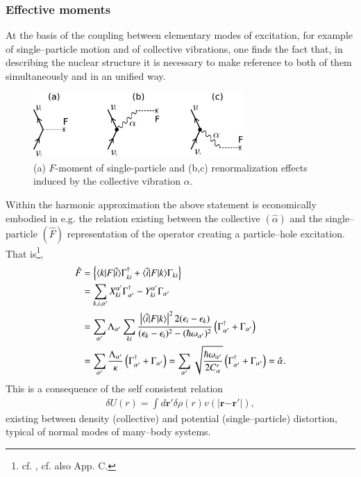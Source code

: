 \begin{subappendices}
\subsubsection{Effective moments}
At the basis of the coupling between elementary modes of excitation, for example of single--particle motion and of collective vibrations, one finds the fact that, in describing the nuclear structure it is necessary to make reference to both of them simultaneously and in an unified way.
   \begin{figure}
   \centerline{\includegraphics*[width=8cm,angle=0	]{nutshell/figs/fig3_A_1}}
   \caption{(a) $F$-moment of single-particle and (b,c) renormalization effects induced by the collective vibration $\alpha$.}\label{fig3.A.1}
   \end{figure}

Within the harmonic approximation the above statement is economically embodied in e.g. the relation existing between the collective $(\hat \alpha)$ and the single--particle $(\hat F)$ representation of the operator creating a particle--hole excitation. That is\footnote{cf. \cite{Bohr:75}, cf. also \cite{Brink:05} App. C.}, 
\begin{align}\label{eq1AppE1}
\nonumber \hat F&=\left\{\langle {k|F|\tilde i} \rangle\Gamma_{ki}^\dagger+\langle {\tilde i|F|k} \rangle\Gamma_{ki}\right\}\\
\nonumber &=\sum_{k,i,\alpha'}X_{ki}^{\alpha'}\Gamma_{\alpha'}^{\dagger}-Y_{ki}^{\alpha'}\Gamma_{\alpha'}\\
\nonumber &=\sum_{\alpha'}\Lambda_{\alpha'}\sum_{ki}\frac{\left|\langle {\tilde i|F|k} \rangle\right|^22(\epsilon_i-\epsilon_k)}{(\epsilon_k-\epsilon_i)^2-(\hbar\omega_{\alpha'})^2}\left(\Gamma_{\alpha'}^\dagger+\Gamma_{\alpha'}\right)\\
 &=\sum_{\alpha'}\frac{\Lambda_{\alpha'}}{\kappa}\left(\Gamma_{\alpha'}^{\dagger}+\Gamma_{\alpha'}\right)=\sum_{\alpha'}\sqrt{\frac{\hbar\omega_{\alpha'}}{2C_\alpha'}}\left(\Gamma_{\alpha'}^{\dagger}+\Gamma_{\alpha'}\right)=\hat \alpha.
\end{align}
This is a consequence of the self consistent relation
\begin{align}
\delta U(r)=\int d\mathbf r' \delta \rho(r)v(|\mathbf r{-\mathbf r'}|),
\end{align}
existing between density (collective) and potential (single--particle) distortion, typical of normal modes of many--body systems.


\end{subappendices}
